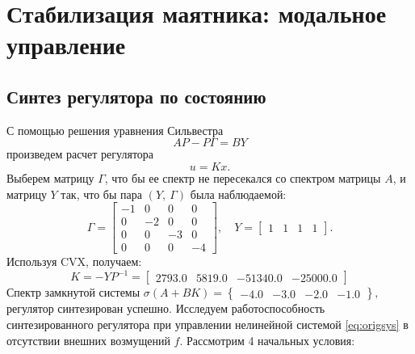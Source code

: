 \chapter{Стабилизация маятника: модальное управление}

\section{Синтез регулятора по состоянию}

С помощью решения уравнения Сильвестра
\begin{equation}
    \label{eq:3.1.synv}
    AP-P\Gamma=BY
\end{equation}
произведем расчет регулятора
\begin{equation}
    \label{eq:3.1.reg}
    u=Kx.
\end{equation}
Выберем матрицу $\Gamma$, что бы ее спектр не пересекался со спектром матрицы $A$,
и матрицу $Y$ так, что бы пара $(Y,\ \Gamma)$ была наблюдаемой:
\begin{equation*}
    \Gamma=\begin{bmatrix}
        -1 & 0 & 0 & 0\\
        0 & -2 & 0 & 0\\
        0 & 0 & -3 & 0\\
        0 & 0 & 0 & -4
    \end{bmatrix},\quad
    Y=\begin{bmatrix}
        1&1&1&1
    \end{bmatrix}.
\end{equation*}
Используя CVX, получаем:
\begin{equation*}
    K=-YP^{-1}=\begin{bmatrix}
        2793.0 & 5819.0 & -51340.0 & -25000.0
    \end{bmatrix}
\end{equation*}
Спектр замкнутой системы $\sigma(A+BK)=\left\{\begin{array}{cccc}
-4.0 & -3.0 & -2.0 & -1.0
\end{array}\right\},$ регулятор синтезирован успешно.
Исследуем работоспособность синтезированного регулятора
при управлении нелинейной системой \eqref{eq:origsys}
в отсутствии внешних возмущений $f$. 
Рассмотрим 4 начальных условия:
